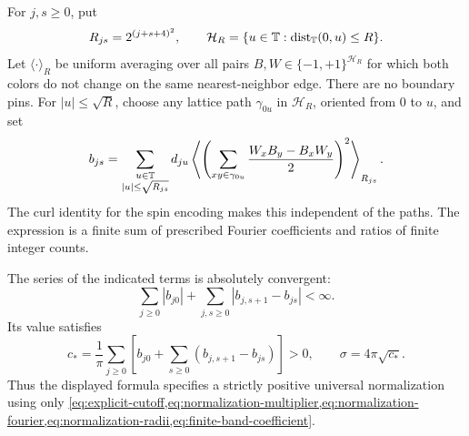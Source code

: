 For \(j,s\ge0\), put
\begin{equation}
 \label{eq:normalization-radii}
 R_{js}=2^{(j+s+4)^2},\qquad
 \mathcal H_R=\{u\in\mathbb T:\operatorname{dist}_{\mathbb T}(0,u)\le R\}.
\end{equation}
Let \(\langle\cdot\rangle_R\) be uniform averaging over all pairs
\(B,W\in\{-1,+1\}^{\mathcal H_R}\) for which both colors do not change on the
same nearest-neighbor edge. There are no boundary pins. For
\(|u|\le\sqrt R\), choose any lattice path \(\gamma_{0u}\) in
\(\mathcal H_R\), oriented from \(0\) to \(u\), and set
\begin{equation}
 \label{eq:finite-band-coefficient}
 b_{js}=\sum_{\substack{u\in\mathbb T\\ |u|\le\sqrt{R_{js}}}}d_{ju}
  \left\langle
   \left(\sum_{xy\in\gamma_{0u}}
           \frac{W_xB_y-B_xW_y}{2}\right)^2
  \right\rangle_{R_{js}}.
\end{equation}
The curl identity for the spin encoding makes this independent of the paths.
The expression is a finite sum of prescribed Fourier coefficients and ratios
of finite integer counts.

\begin{proposition}
\label{prop:normalization-series}
The series of the indicated terms is absolutely convergent:
\begin{equation}
 \label{eq:normalization-absolute}
 \sum_{j\ge0}|b_{j0}|+
       \sum_{j,s\ge0}|b_{j,s+1}-b_{js}|<\infty.
\end{equation}
Its value satisfies
\begin{equation}
 \label{eq:finite-normalization}
 c_*=\frac1\pi\sum_{j\ge0}
       \left[b_{j0}+\sum_{s\ge0}(b_{j,s+1}-b_{js})\right]>0,
 \qquad
 \sigma=4\pi\sqrt{c_*}.
\end{equation}
Thus the displayed formula specifies a strictly positive universal
normalization using only \cref{eq:explicit-cutoff,eq:normalization-multiplier,eq:normalization-fourier,eq:normalization-radii,eq:finite-band-coefficient}.
\end{proposition}

